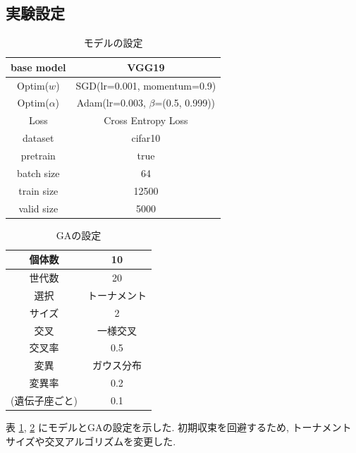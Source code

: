 \documentclass[twocolumn]{jarticle}     %
\begin{document}
\subsection{実験設定}

\begin{table}[tb]
  \begin{center}
    \caption{モデルの設定}
    \begin{tabular}{|c|c|} \hline
      base model & VGG19 \\ \hline
      Optim($w$) & SGD(lr=0.001, momentum=0.9) \\ \hline
      Optim($\alpha$) & Adam(lr=0.003, $\beta$=(0.5, 0.999)) \\ \hline
      Loss & Cross Entropy Loss \\ \hline
      dataset & cifar10 \\ \hline
      pretrain & true \\ \hline
      batch size & 64 \\ \hline
      train size & 12500 \\ \hline
      valid size & 5000 \\ \hline
    \end{tabular}
    \label{tab:setting}
  \end{center}
\end{table}

\begin{table}[tb]
  \begin{center}
    \caption{GAの設定}
    \begin{tabular}{|c|c|} \hline
      個体数 & 10 \\ \hline
      世代数 & 20 \\ \hline \hline
      選択 & トーナメント \\ \hline
      サイズ & 2 \\ \hline \hline
      交叉 & 一様交叉 \\ \hline
      交叉率 & 0.5 \\ \hline \hline
      変異 & ガウス分布 \\ \hline
      変異率 & 0.2 \\
      (遺伝子座ごと) & 0.1 \\ \hline
    \end{tabular}
    \label{tab:setting_ga}
  \end{center}
\end{table}

表 \ref{tab:setting}, \ref{tab:setting_ga} にモデルとGAの設定を示した.
初期収束を回避するため, トーナメントサイズや交叉アルゴリズムを変更した.
\end{document}
